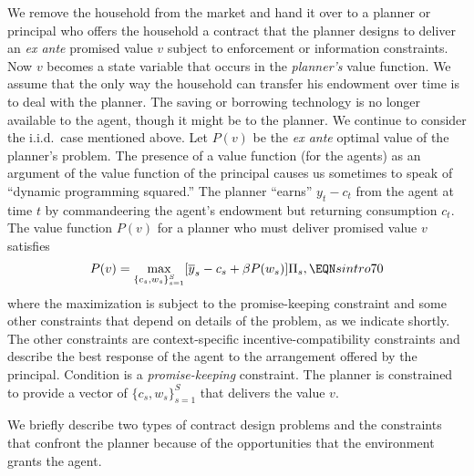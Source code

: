 We remove the household from the market and hand it over to a
planner or principal who offers the household a contract that the
planner designs to deliver an {\it ex ante\/} promised value $v$
subject to enforcement or information constraints. Now $v$ becomes a state variable that occurs in the {\it
planner's\/} value function. We assume that the only way the
household can transfer his endowment over time is to deal with the
planner.  The saving or borrowing technology  is no
longer available to the agent, though it might be to the planner.
We continue to consider the i.i.d.\  case mentioned above. Let
$P(v)$ be the {\it ex ante\/} optimal value of the planner's
problem. The presence of a value function (for the agents) as an
argument of the value function of the principal causes us
sometimes to  speak of ``dynamic programming squared.''
%
 The planner
``earns'' $y_t - c_t$ from the agent at time $t$ by commandeering
the agent's endowment but returning consumption $c_t$. The value
function  $P(v)$ for a planner who must deliver promised value
$v$  satisfies
$$ P(v) = \max_{\{c_s, w_s\}_{s=1}^S} [\overline y_s - c_s + \beta P(w_s) ] \Pi_s,
\EQN sintro70 $$
where the maximization is subject to the promise-keeping
constraint  and some other constraints that depend on
details of the problem, as we indicate shortly.  The other
constraints are context-specific
incentive-compatibility constraints
and describe the best response
of the agent to the arrangement offered by the principal.
Condition  is a {\it promise-keeping\/} constraint.
The planner is constrained to provide a vector of $\{c_s, w_s  \}_{s=1}^S$
that delivers the value $v$.

We briefly describe two
types of contract design problems and the constraints
that confront the planner because of the opportunities
that the environment grants the agent.






